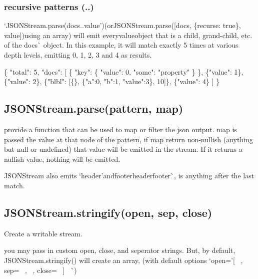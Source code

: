 \subsubsection*{recursive patterns (..)}

`J\+S\+O\+N\+Stream.\+parse(\textquotesingle{}docs..value'){\ttfamily  (or}J\+S\+O\+N\+Stream.\+parse(\mbox{[}\textquotesingle{}docs\textquotesingle{}, \{recurse\+: true\}, \textquotesingle{}value\textquotesingle{}\mbox{]}){\ttfamily using an array) will emit every}value{\ttfamily object that is a child, grand-\/child, etc. of the }docs\`{} object. In this example, it will match exactly 5 times at various depth levels, emitting 0, 1, 2, 3 and 4 as results.


\begin{DoxyCode}
\{
  "total": 5,
  "docs": [
    \{
      "key": \{
        "value": 0,
        "some": "property"
      \}
    \},
    \{"value": 1\},
    \{"value": 2\},
    \{"blbl": [\{\}, \{"a":0, "b":1, "value":3\}, 10]\},
    \{"value": 4\}
  ]
\}
\end{DoxyCode}


\subsection*{J\+S\+O\+N\+Stream.\+parse(pattern, map)}

provide a function that can be used to map or filter the json output. {\ttfamily map} is passed the value at that node of the pattern, if {\ttfamily map} return non-\/nullish (anything but {\ttfamily null} or {\ttfamily undefined}) that value will be emitted in the stream. If it returns a nullish value, nothing will be emitted.

{\ttfamily J\+S\+O\+N\+Stream} also emits `\textquotesingle{}header'{\ttfamily and}\textquotesingle{}footer\textquotesingle{}header\textquotesingle{}footer\textquotesingle{}\`{}, is anything after the last match.

\subsection*{J\+S\+O\+N\+Stream.\+stringify(open, sep, close)}

Create a writable stream.

you may pass in custom {\ttfamily open}, {\ttfamily close}, and {\ttfamily seperator} strings. But, by default, {\ttfamily J\+S\+O\+N\+Stream.\+stringify()} will create an array, (with default options `open='\mbox{[}~\newline
\textquotesingle{}, sep=\textquotesingle{}~\newline
,~\newline
\textquotesingle{}, close=\textquotesingle{}~\newline
\mbox{]}~\newline
\textquotesingle{}\`{})

